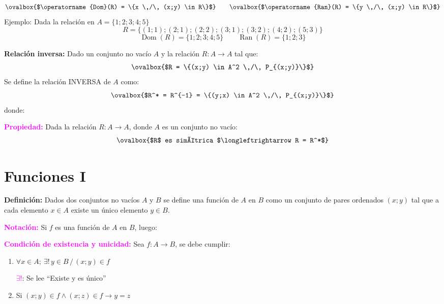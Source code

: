 \documentclass[11pt,a4paper]{article}
\begin{document}
\[
\ovalbox{$\operatorname{Dom}(R) = \{x \,/\, (x;y) \in R\}$}
\qquad
\ovalbox{$\operatorname{Ran}(R) = \{y \,/\, (x;y) \in R\}$}
\]
Ejemplo: Dada la relación en $A = \{1; 2; 3; 4; 5\}$
\[R = \{(1;1); (2;1); (2;2); (3;1); (3;2); (4;2); (5;3)\}\]
\[\operatorname{Dom}(R) = \{1; 2; 3; 4; 5\} \qquad \operatorname{Ran}(R) = \{1; 2; 3\}\]

\textbf{Relación inversa:} Dado un conjunto no vacío $A$ y la relación $R: A \to A$ tal que:
\[\ovalbox{$R = \{(x;y) \in A^2 \,/\, P_{(x;y)}\}$}\]
Se define la relación INVERSA de $A$ como:
\[\ovalbox{$R^* = R^{-1} = \{(y;x) \in A^2 \,/\, P_{(x;y)}\}$}\]
donde: \ 

\textcolor{magenta}{\textbf{Propiedad:}} Dada la relación $R: A \to A$, donde $A$ es un
conjunto no vacío:
\[\ovalbox{$R$ es simétrica $\longleftrightarrow R = R^*$}\]

\newpage
\section{Funciones I}

\textbf{Definición:} Dados dos conjuntos no vacíos $A$ y $B$ se define una función de $A$ en
$B$ como un conjunto de pares ordenados $(x;y)$ tal que a cada elemento $x \in A$ existe un
único elemento $y \in B$.

\textcolor{magenta}{\textbf{Notación:}} Si $f$ es una función de $A$ en $B$, luego:
\ 

\textcolor{magenta}{\textbf{Condición de existencia y unicidad:}} Sea $f: A \to B$, se debe
cumplir:

\begin{minipage}[t]{0.485\textwidth}
\begin{enumerate}
  \item $\forall x \in A;\ \exists!\, y \in B \,/\, (x;y) \in f$

  \textcolor{magenta}{$\exists!$}: Se lee ``Existe y es único''
\end{enumerate}
\end{minipage}\hfill
\begin{minipage}[t]{0.485\textwidth}
\begin{enumerate}\setcounter{enumi}{1}
  \item Si $(x;y) \in f \wedge (x;z) \in f \rightarrow y = z$
\end{enumerate}
\end{minipage}
\end{document}
